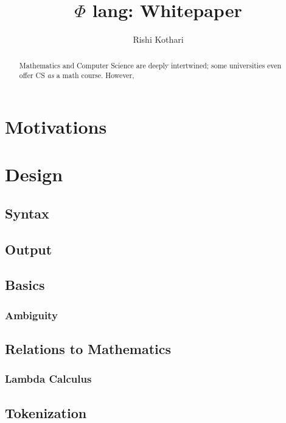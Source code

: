 \documentclass[11pt, oneside]{article}
\title{$\Phi$ lang: Whitepaper}
\author{Rishi Kothari}
\date{}
\begin{document}
\maketitle

\newpage

\tableofcontents
\newpage
{}
\begin{abstract}
	Mathematics and Computer Science are deeply intertwined; some universities even offer CS \textit{as} a math course. However, 
\end{abstract}

\section{Motivations}


\section{Design}

\subsection{Syntax}


\subsection{Output}


\subsection{Basics}


\subsubsection{Ambiguity}


\subsection{Relations to Mathematics}

\subsubsection{Lambda Calculus}

\subsection{Tokenization}
\end{document}
